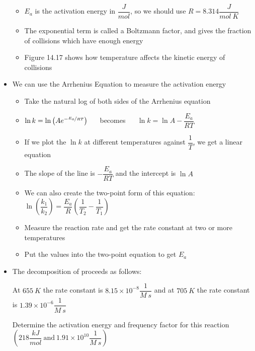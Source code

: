 \documentclass[12pt, openany, letterpaper]{memoir}
\begin{document}
\begin{itemize}
\begin{itemize}
		\item $E_a$ is the activation energy in $\dfrac{J}{mol}$, so we should use $R=8.314\dfrac{J}{mol~K}$
		\item The exponential term is called a Boltzmann factor, and gives the fraction of collisions which have enough energy
		\item Figure 14.17 shows how temperature affects the kinetic energy of collisions
	\end{itemize}
	\item We can use the Arrhenius Equation to measure the activation energy
	\begin{itemize}
		\item Take the natural log of both sides of the Arrhenius equation
		\item $\ln k=\ln\left(Ae^{-\nicefrac{E_a}{RT}}\right)$ ~~ becomes ~~ $\ln k = \ln A - \dfrac{E_a}{RT}$
		\item If we plot the $\ln k$ at different temperatures against $\dfrac{1}{T}$, we get a linear equation
		\item The slope of the line is $-\dfrac{E_a}{RT}$ and the intercept is $\ln A$
		\item We can also create the two-point form of this equation: $\ln\left(\dfrac{k_1}{k_2}\right)=\dfrac{E_a}{R}\left(\dfrac{1}{T_2}-\dfrac{1}{T_1}\right)$
		\item Measure the reaction rate and get the rate constant at two or more temperatures
		\item Put the values into the two-point equation to get $E_a$		
	\end{itemize}
	\item The decomposition of  proceeds as follows: 
	
	At $655~K$ the rate constant is $8.15\times10^{-8}\dfrac{1}{M~s}$ and at $705~K$ the rate constant is $1.39\times10^{-6}\dfrac{1}{M~s}$
	
	Determine the activation energy and frequency factor for this reaction $\left(218\dfrac{kJ}{mol}~\mathrm{and}~1.91\times10^{10}\dfrac{1}{M~s}\right)$
\end{itemize}
\end{document}

